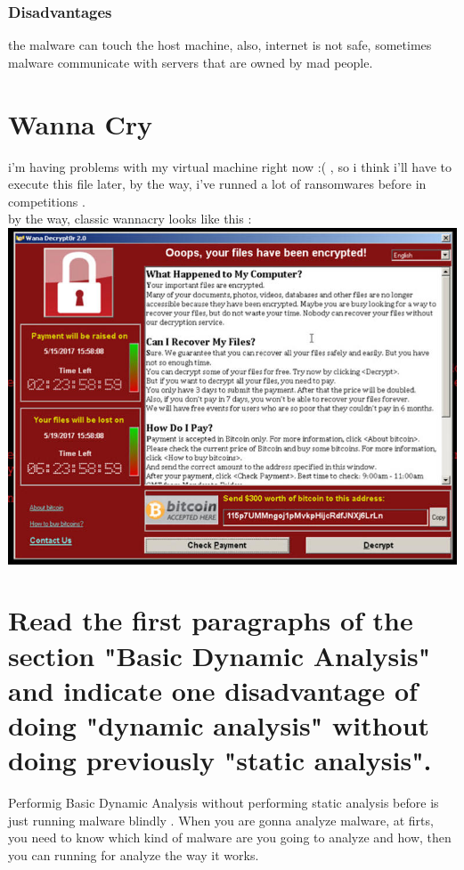 \documentclass[10pt,a4paper]{article} %
\begin{document}
            \subsubsection{Disadvantages}
                the malware can touch the host machine, also, internet is not
                safe, sometimes malware communicate with servers that are owned
                by mad people.

        \section{Wanna Cry}
        \color{red} i'm having problems with my virtual machine right now :( , so i
        think i'll have to execute this file later, by the way, i've runned a
        lot of ransomwares before in competitions \color{white}.
        \\ by the way, classic wannacry looks like this :
            \\
            \includegraphics[width=0.8\linewidth]{wannacry.jpg}
            \\

        \section{Read the first paragraphs of the section "Basic Dynamic
        Analysis" and indicate one disadvantage of doing "dynamic analysis"
        without doing previously "static analysis".}
            Performig Basic Dynamic Analysis without performing static analysis
            before is just running malware blindly . When you are gonna analyze
            malware, at firts, you need to know which kind of malware are you
            going to analyze and how, then you can running for analyze the way
            it works.
\end{document}
